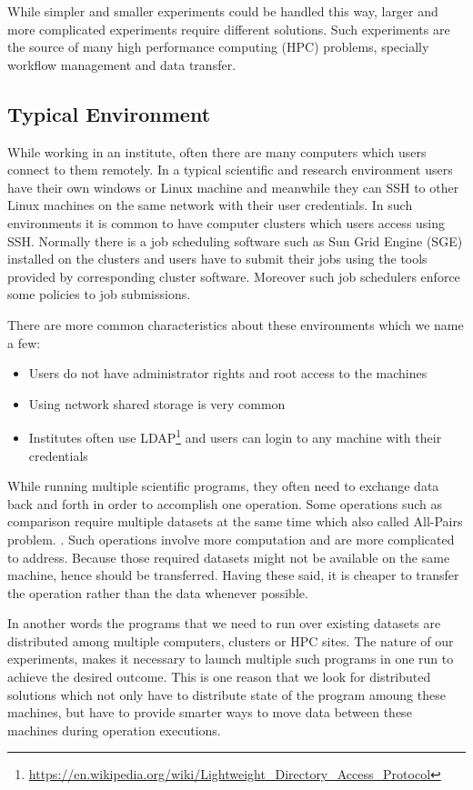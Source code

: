 While simpler and smaller experiments could be handled this way, larger and more complicated experiments
require different solutions. 
Such experiments are the source of many high performance computing (HPC) problems, specially workflow management and data transfer.

\subsection{Typical Environment}
While working in an institute, often there are many computers which users connect to them remotely. In a typical
scientific and research environment users have their own windows or Linux machine and meanwhile they can SSH to other
Linux machines on the same network with their user credentials. In such environments it is common to have computer clusters
which users access using SSH. Normally there is a job scheduling software such as Sun Grid Engine (SGE) installed on the clusters
and users have to submit their jobs using the tools provided by corresponding cluster software.
Moreover such job schedulers enforce some policies to job submissions.

There are more common characteristics about these environments which we name a few:
\begin{itemize}
\item Users do not have administrator rights and root access to the machines
\item Using network shared storage is very common
\item Institutes often use LDAP\footnote{\url{https://en.wikipedia.org/wiki/Lightweight_Directory_Access_Protocol}} 
and users can login to any machine with their credentials
\end{itemize}

While running multiple scientific programs, they often need to exchange data back and forth in order to accomplish one operation.
Some operations such as comparison require multiple datasets at the same time which also called All-Pairs problem. \cite{moretti08}. 
Such operations involve more computation and are more complicated to address. Because those required datasets 
might not be available on the same machine, hence should be transferred. 
Having these said, it is cheaper to transfer the operation rather than the data whenever possible. 

In another words the programs that we need to run over existing datasets are distributed among multiple
computers, clusters or HPC sites. The nature of our experiments, makes it necessary to launch
multiple such programs in one run to achieve the desired outcome. This is one reason that we look
for distributed solutions which not only have to distribute state of the program amoung these machines,
but have to provide smarter ways to move data between these machines during operation executions.

